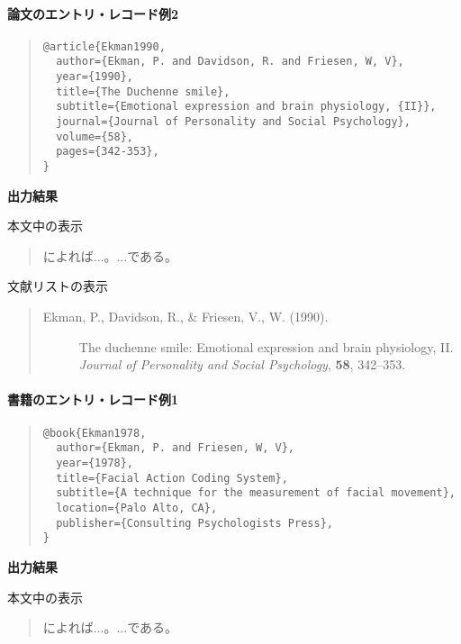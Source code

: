 \documentclass[12pt]{ltjsarticle}
\begin{document}
\paragraph{論文のエントリ・レコード例2}

\begin{quote}
\begin{verbatim}
@article{Ekman1990,
  author={Ekman, P. and Davidson, R. and Friesen, W, V},
  year={1990},
  title={The Duchenne smile},
  subtitle={Emotional expression and brain physiology, {II}},
  journal={Journal of Personality and Social Psychology},
  volume={58},
  pages={342-353},
}
\end{verbatim}
\end{quote}

\textbf{出力結果}

本文中の表示
\begin{quote}
\textcite{Ekman1990}によれば...。...である\parencite{Ekman1990}。
\end{quote}

文献リストの表示
\begin{quote}
\begin{description}
  \item[\textrm{Ekman, P., Davidson, R., \& Friesen, V., W. (1990).}]The duchenne smile: Emotional expression and brain physiology, II. \textit{Journal of Personality and Social Psychology}, \textbf{58}, 342--353.
\end{description}
\end{quote}


\paragraph{書籍のエントリ・レコード例1}

\begin{quote}
\begin{verbatim}
@book{Ekman1978,
  author={Ekman, P. and Friesen, W, V},
  year={1978},
  title={Facial Action Coding System},
  subtitle={A technique for the measurement of facial movement},
  location={Palo Alto, CA},
  publisher={Consulting Psychologists Press},
}
\end{verbatim}
\end{quote}

\textbf{出力結果}

本文中の表示
\begin{quote}
\textcite{Ekman1978}によれば...。...である\parencite{Ekman1978}。
\end{quote}
\end{document}
